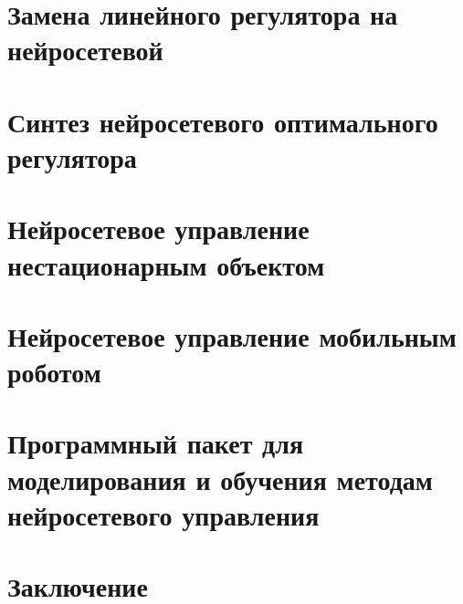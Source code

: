 \documentclass[12pt]{rusthesis}
\begin{document}
\chapter{Замена линейного регулятора на нейросетевой}%
\label{linear_to_neural}
%

\chapter{Синтез нейросетевого оптимального регулятора}%
\label{neural_optimal_control}
%

\chapter{Нейросетевое управление нестационарным объектом}%
\label{nonst_neural_control}


\chapter{Нейросетевое управление мобильным роботом}%
\label{mobile_robot}


\chapter{Программный пакет для моделирования и обучения методам нейросетевого управления}%
\label{lab_works}


\chapter*{Заключение}




%

%
\end{document}
